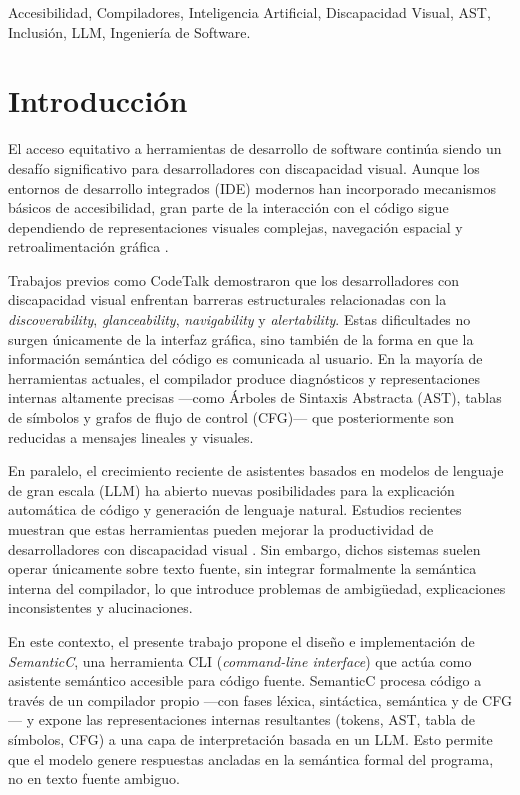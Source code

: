 \documentclass[conference]{IEEEtran}
\begin{document}
\begin{IEEEkeywords}
Accesibilidad, Compiladores, Inteligencia Artificial, Discapacidad Visual, AST, Inclusión, LLM, Ingeniería de Software.
\end{IEEEkeywords}

\section{Introducción}
El acceso equitativo a herramientas de desarrollo de software continúa siendo un desafío significativo para desarrolladores con discapacidad visual. Aunque los entornos de desarrollo integrados (IDE) modernos han incorporado mecanismos básicos de accesibilidad, gran parte de la interacción con el código sigue dependiendo de representaciones visuales complejas, navegación espacial y retroalimentación gráfica \cite{codetalk}.

Trabajos previos como CodeTalk \cite{codetalk} demostraron que los desarrolladores con discapacidad visual enfrentan barreras estructurales relacionadas con la \textit{discoverability}, \textit{glanceability}, \textit{navigability} y \textit{alertability}. Estas dificultades no surgen únicamente de la interfaz gráfica, sino también de la forma en que la información semántica del código es comunicada al usuario. En la mayoría de herramientas actuales, el compilador produce diagnósticos y representaciones internas altamente precisas —como Árboles de Sintaxis Abstracta (AST), tablas de símbolos y grafos de flujo de control (CFG)— que posteriormente son reducidas a mensajes lineales y visuales.

En paralelo, el crecimiento reciente de asistentes basados en modelos de lenguaje de gran escala (LLM) ha abierto nuevas posibilidades para la explicación automática de código y generación de lenguaje natural. Estudios recientes muestran que estas herramientas pueden mejorar la productividad de desarrolladores con discapacidad visual \cite{genai_accessibility}. Sin embargo, dichos sistemas suelen operar únicamente sobre texto fuente, sin integrar formalmente la semántica interna del compilador, lo que introduce problemas de ambigüedad, explicaciones inconsistentes y alucinaciones.

En este contexto, el presente trabajo propone el diseño e implementación de \textit{SemanticC}, una herramienta CLI (\textit{command-line interface}) que actúa como asistente semántico accesible para código fuente. SemanticC procesa código a través de un compilador propio —con fases léxica, sintáctica, semántica y de CFG— y expone las representaciones internas resultantes (tokens, AST, tabla de símbolos, CFG) a una capa de interpretación basada en un LLM. Esto permite que el modelo genere respuestas ancladas en la semántica formal del programa, no en texto fuente ambiguo.
\end{document}
